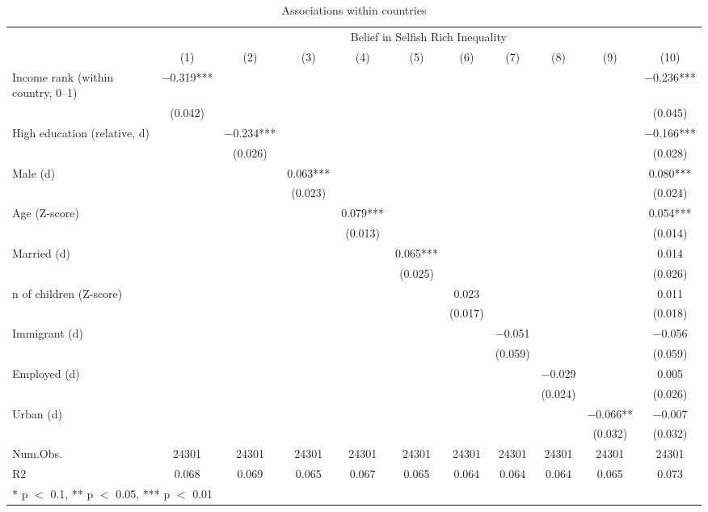 \begin{table}

\caption{\label{tab:unnamed-chunk-49}Associations within countries}
\centering
\begin{tabular}[t]{lcccccccccc}
\toprule
\multicolumn{1}{c}{ } & \multicolumn{10}{c}{Belief in Selfish Rich Inequality} \\
\cmidrule(l{3pt}r{3pt}){2-11}
  & (1) & (2) & (3) & (4) & (5) & (6) & (7) & (8) & (9) & (10)\\
\midrule
Income rank (within country, 0--1) & \num{-0.319}*** &  &  &  &  &  &  &  &  & \num{-0.236}***\\
 & (\num{0.042}) &  &  &  &  &  &  &  &  & (\num{0.045})\\
High education (relative, d) &  & \num{-0.234}*** &  &  &  &  &  &  &  & \num{-0.166}***\\
 &  & (\num{0.026}) &  &  &  &  &  &  &  & (\num{0.028})\\
Male (d) &  &  & \num{0.063}*** &  &  &  &  &  &  & \num{0.080}***\\
 &  &  & (\num{0.023}) &  &  &  &  &  &  & (\num{0.024})\\
Age (Z-score) &  &  &  & \num{0.079}*** &  &  &  &  &  & \num{0.054}***\\
 &  &  &  & (\num{0.013}) &  &  &  &  &  & (\num{0.014})\\
Married (d) &  &  &  &  & \num{0.065}*** &  &  &  &  & \num{0.014}\\
 &  &  &  &  & (\num{0.025}) &  &  &  &  & (\num{0.026})\\
n of children (Z-score) &  &  &  &  &  & \num{0.023} &  &  &  & \num{0.011}\\
 &  &  &  &  &  & (\num{0.017}) &  &  &  & (\num{0.018})\\
Immigrant (d) &  &  &  &  &  &  & \num{-0.051} &  &  & \num{-0.056}\\
 &  &  &  &  &  &  & (\num{0.059}) &  &  & (\num{0.059})\\
Employed (d) &  &  &  &  &  &  &  & \num{-0.029} &  & \num{0.005}\\
 &  &  &  &  &  &  &  & (\num{0.024}) &  & (\num{0.026})\\
Urban (d) &  &  &  &  &  &  &  &  & \num{-0.066}** & \num{-0.007}\\
 &  &  &  &  &  &  &  &  & (\num{0.032}) & (\num{0.032})\\
\midrule
Num.Obs. & \num{24301} & \num{24301} & \num{24301} & \num{24301} & \num{24301} & \num{24301} & \num{24301} & \num{24301} & \num{24301} & \num{24301}\\
R2 & \num{0.068} & \num{0.069} & \num{0.065} & \num{0.067} & \num{0.065} & \num{0.064} & \num{0.064} & \num{0.064} & \num{0.065} & \num{0.073}\\
\bottomrule
\multicolumn{11}{l}{\rule{0pt}{1em}* p $<$ 0.1, ** p $<$ 0.05, *** p $<$ 0.01}\\
\end{tabular}
\end{table}